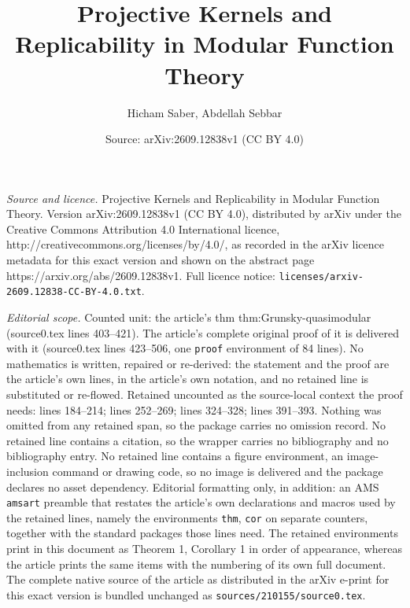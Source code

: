 \documentclass[10pt,a4paper]{amsart}
\title{Projective Kernels and Replicability in Modular Function Theory}
\author{Hicham Saber, Abdellah Sebbar}
\date{Source: arXiv:2609.12838v1 (CC BY 4.0)}
\begin{document}
\maketitle

\noindent\emph{Source and licence.} Projective Kernels and Replicability in Modular Function Theory. Version arXiv:2609.12838v1 (CC BY 4.0), distributed by arXiv under the Creative Commons Attribution 4.0 International licence, http://creativecommons.org/licenses/by/4.0/, as recorded in the arXiv licence metadata for this exact version and shown on the abstract page https://arxiv.org/abs/2609.12838v1. Full licence notice: \texttt{licenses/arxiv-2609.12838-CC-BY-4.0.txt}.\par\smallskip

\noindent\textit{Editorial scope.} Counted unit: the article's thm thm:Grunsky-quasimodular (source0.tex lines 403--421). The article's complete original proof of it is delivered with it (source0.tex lines 423--506, one \texttt{proof} environment of 84 lines). No mathematics is written, repaired or re-derived: the statement and the proof are the article's own lines, in the article's own notation, and no retained line is substituted or re-flowed.  Retained uncounted as the source-local context the proof needs: lines 184--214; lines 252--269; lines 324--328; lines 391--393.  Nothing was omitted from any retained span, so the package carries no omission record.  No retained line contains a citation, so the wrapper carries no bibliography and no bibliography entry.  No retained line contains a figure environment, an image-inclusion command or drawing code, so no image is delivered and the package declares no asset dependency.  Editorial formatting only, in addition: an AMS \texttt{amsart} preamble that restates the article's own declarations and macros used by the retained lines, namely the environments \texttt{thm}, \texttt{cor} on separate counters, together with the standard packages those lines need.  The retained environments print in this document as Theorem 1, Corollary 1 in order of appearance, whereas the article prints the same items with the numbering of its own full document.  The complete native source of the article as distributed in the arXiv e-print for this exact version is bundled unchanged as \texttt{sources/210155/source0.tex}.
\end{document}
